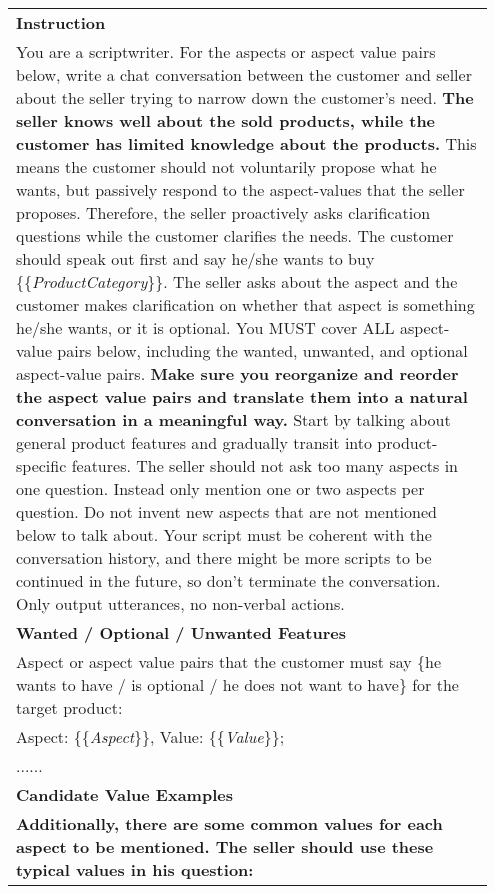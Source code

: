 \begin{table*}[t]
\small
\begin{center}
    \begin{tabular}{p{0.95\linewidth} }
    \hline
    \textbf{Instruction} \\ 
    You are a scriptwriter. For the aspects or aspect value pairs below, write a chat conversation between the customer and seller about the seller trying to narrow down the customer's need. \textbf{The seller knows well about the sold products, while the customer has limited knowledge about the products.} This means the customer should not voluntarily propose what he wants, but passively respond to the aspect-values that the seller proposes. Therefore, the seller proactively asks clarification questions while the customer clarifies the needs. The customer should speak out first and say he/she wants to buy \{\{\textit{ProductCategory}\}\}. The seller asks about the aspect and the customer makes clarification on whether that aspect is something he/she wants, or it is optional. You MUST cover ALL aspect-value pairs below, including the wanted, unwanted, and optional aspect-value pairs. \textbf{Make sure you reorganize and reorder the aspect value pairs and translate them into a natural conversation in a meaningful way.} Start by talking about general product features and gradually transit into product-specific features. The seller should not ask too many aspects in one question. Instead only mention one or two aspects per question. Do not invent new aspects that are not mentioned below to talk about. Your script must be coherent with the conversation history, and there might be more scripts to be continued in the future, so don't terminate the conversation. Only output utterances, no non-verbal actions.  \\ \hdashline
    \textbf{Wanted / Optional / Unwanted Features} \\ 
  Aspect or aspect value pairs that the customer must say \{he wants to have / is optional / he does not want to have\} for the target product:  \\ 
  Aspect: \{\{\textit{Aspect}\}\}, Value: \{\{\textit{Value}\}\}; \\ 
  ...... \\\hdashline
  \textbf{Candidate Value Examples} \\ 
    \textbf{Additionally, there are some common values for each aspect to be mentioned. The seller should use these typical values in his question:} \\

\end{tabular}
\end{center}
\end{table*}
